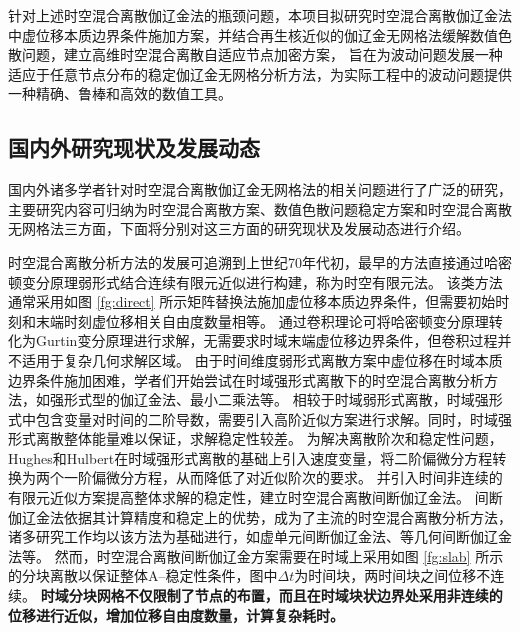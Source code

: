 针对上述时空混合离散伽辽金法的瓶颈问题，本项目拟研究时空混合离散伽辽金法中虚位移本质边界条件施加方案，并结合再生核近似的伽辽金无网格法缓解数值色散问题，建立高维时空混合离散自适应节点加密方案，
旨在为波动问题发展一种适应于任意节点分布的稳定伽辽金无网格分析方法，为实际工程中的波动问题提供一种精确、鲁棒和高效的数值工具。

\subsection{国内外研究现状及发展动态}

国内外诸多学者针对时空混合离散伽辽金无网格法的相关问题进行了广泛的研究，主要研究内容可归纳为时空混合离散方案、数值色散问题稳定方案和时空混合离散无网格法三方面，下面将分别对这三方面的研究现状及发展动态进行介绍。

时空混合离散分析方法的发展可追溯到上世纪70年代初\cite{argyris1969a}，最早的方法直接通过哈密顿变分原理弱形式结合连续有限元近似进行构建，称为时空有限元法。
该类方法通常采用如图 \ref{fg:direct} 所示矩阵替换法施加虚位移本质边界条件，但需要初始时刻和末端时刻虚位移相关自由度数量相等。
通过卷积理论可将哈密顿变分原理转化为Gurtin变分原理进行求解，无需要求时域末端虚位移边界条件\cite{Peng1992}，但卷积过程并不适用于复杂几何求解区域。
由于时间维度弱形式离散方案中虚位移在时域本质边界条件施加困难，学者们开始尝试在时域强形式离散下的时空混合离散分析方法，如强形式型的伽辽金法\cite{Li2017a}、最小二乘法\cite{epstein2024}等。
相较于时域弱形式离散，时域强形式中包含变量对时间的二阶导数，需要引入高阶近似方案进行求解。同时，时域强形式离散整体能量难以保证，求解稳定性较差。
为解决离散阶次和稳定性问题，Hughes和Hulbert\cite{hughes1988,hulbert1990}在时域强形式离散的基础上引入速度变量，将二阶偏微分方程转换为两个一阶偏微分方程，从而降低了对近似阶次的要求。
并引入时间非连续的有限元近似方案提高整体求解的稳定性，建立时空混合离散间断伽辽金法。
间断伽辽金法依据其计算精度和稳定上的优势，成为了主流的时空混合离散分析方法，诸多研究工作均以该方法为基础进行，如虚单元间断伽辽金法\cite{xu2025}、等几何间断伽辽金法\cite{lejeunes2024}等。
然而，时空混合离散间断伽辽金方案需要在时域上采用如图 \ref{fg:slab} 所示的分块离散以保证整体A--稳定性条件\cite{hughes1988}，图中$\Delta t$为时间块，两时间块之间位移不连续。
\textbf{时域分块网格不仅限制了节点的布置，而且在时域块状边界处采用非连续的位移进行近似，增加位移自由度数量，计算复杂耗时。}

